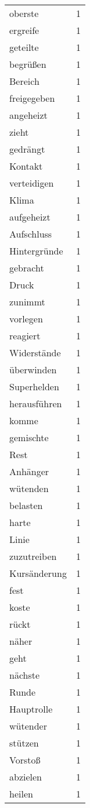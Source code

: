 \begin{tabular}{lr}
oberste & 1 \\
ergreife & 1 \\
geteilte & 1 \\
begrüßen & 1 \\
Bereich & 1 \\
freigegeben & 1 \\
angeheizt & 1 \\
zieht & 1 \\
gedrängt & 1 \\
Kontakt & 1 \\
verteidigen & 1 \\
Klima & 1 \\
aufgeheizt & 1 \\
Aufschluss & 1 \\
Hintergründe & 1 \\
gebracht & 1 \\
Druck & 1 \\
zunimmt & 1 \\
vorlegen & 1 \\
reagiert & 1 \\
Widerstände & 1 \\
überwinden & 1 \\
Superhelden & 1 \\
herausführen & 1 \\
komme & 1 \\
gemischte & 1 \\
Rest & 1 \\
Anhänger & 1 \\
wütenden & 1 \\
belasten & 1 \\
harte & 1 \\
Linie & 1 \\
zuzutreiben & 1 \\
Kursänderung & 1 \\
fest & 1 \\
koste & 1 \\
rückt & 1 \\
näher & 1 \\
geht & 1 \\
nächste & 1 \\
Runde & 1 \\
Hauptrolle & 1 \\
wütender & 1 \\
stützen & 1 \\
Vorstoß & 1 \\
abzielen & 1 \\
heilen & 1 \\

\end{tabular}
